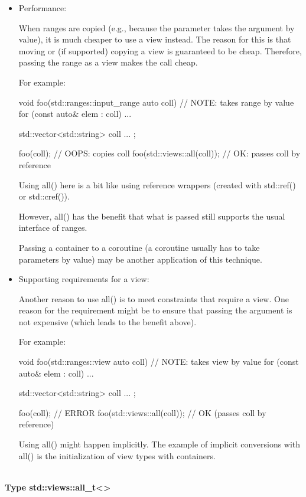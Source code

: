 \begin{itemize}
\item
Performance:

When ranges are copied (e.g., because the parameter takes the argument by value), it is much cheaper to use a view instead. The reason for this is that moving or (if supported) copying a view is guaranteed to be cheap. Therefore, passing the range as a view makes the call cheap.

For example:

\begin{cpp}
void foo(std::ranges::input_range auto coll) // NOTE: takes range by value
{
	for (const auto& elem : coll) {
		...
	}
}

std::vector<std::string> coll{ ... };

foo(coll); // OOPS: copies coll
foo(std::views::all(coll)); // OK: passes coll by reference
\end{cpp}

Using all() here is a bit like using reference wrappers (created with std::ref() or std::cref()).

However, all() has the benefit that what is passed still supports the usual interface of ranges.

Passing a container to a coroutine (a coroutine usually has to take parameters by value) may be another application of this technique.

\item
Supporting requirements for a view: 

Another reason to use all() is to meet constraints that require a view. One reason for the requirement might be to ensure that passing the argument is not expensive (which leads to the benefit above).

For example:

\begin{cpp}
void foo(std::ranges::view auto coll) // NOTE: takes view by value
{
	for (const auto& elem : coll) {
		...
	}
}

std::vector<std::string> coll{ ... };

foo(coll); // ERROR
foo(std::views::all(coll)); // OK (passes coll by reference)
\end{cpp}

Using all() might happen implicitly. The example of implicit conversions with all() is the initialization of view types with containers.
\end{itemize}

\noindent
\hspace*{\fill} \\ %
\textbf{Type std::views::all\_t<>}

